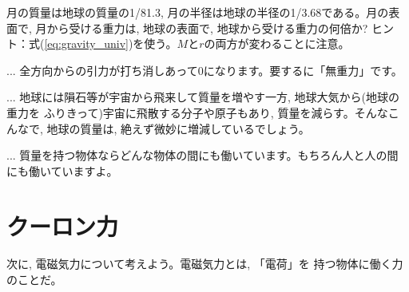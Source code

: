 \begin{q}\label{q:moon_gravity}
月の質量は地球の質量の1/81.3, 月の半径は地球の半径の1/3.68である。月の表面で, 
月から受ける重力は, 地球の表面で, 地球から受ける重力の何倍か?
ヒント：式(\ref{eq:gravity_univ})を使う。$M$と$r$の両方が変わることに注意。
\end{q}
\mv


\begin{faq}{\small{}
... 全方向からの引力が打ち消しあって0になります。要するに「無重力」です。}\end{faq}\mv

\begin{faq}{\small{}
... 地球には隕石等が宇宙から飛来して質量を増やす一方, 地球大気から(地球の重力を
ふりきって)宇宙に飛散する分子や原子もあり, 質量を減らす。そんなこんなで, 地球の質量は, 
絶えず微妙に増減しているでしょう。}\end{faq}\mv

\begin{faq}{\small{}
... 質量を持つ物体ならどんな物体の間にも働いています。もちろん人と人の間にも働いていますよ。}\end{faq}
\hv



\section{クーロン力}\label{sect:CoulombForce}
次に, 電磁気力について考えよう。電磁気力とは, 「電荷」を
持つ物体に働く力のことだ。

